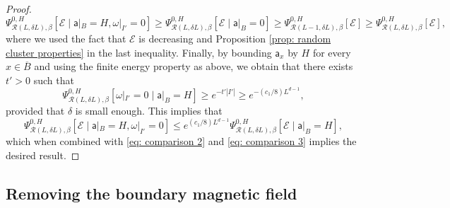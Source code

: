 \documentclass[11pt,a4paper]{article}
\numberwithin{equation}{section}
\theoremstyle{plain}
\theoremstyle{definition}
\begin{document}
\begin{proof}
\begin{equation}\label{eq: comparison 3}
\Psi^{0,H}_{\mathcal{R}(L,\delta L),\beta}[\mathcal{E} \mid \mathsf{a}|_B=H, \omega|_{I'}=0]\geq \Psi^{0,H}_{\mathcal{R}(L,\delta L),\beta}[\mathcal{E}\mid \mathsf{a}|_B=0]\geq \Psi^{0,H}_{\mathcal{R}(L-1,\delta L),\beta}[\mathcal{E}]\geq  \Psi^{0,H}_{\mathcal{R}(L,\delta L),\beta}[\mathcal{E}],
\end{equation}
where we used the fact that $\mathcal{E}$ is decreasing and Proposition \ref{prop: random cluster properties} in the last inequality.
Finally, by bounding $\mathsf{a}_x$ by $H$ for every $x\in \overline{B}$ and using the finite energy property as above, we obtain that there exists $t'>0$ such that
\begin{equation}
\Psi^{0,H}_{\mathcal{R}(L,\delta L),\beta}[\omega|_{I'}=0 \mid \mathsf{a}|_B=H]\geq e^{-t'|I'|}\geq e^{-(c_1/8) L^{d-1}},
\end{equation}
provided that $\delta$ is small enough. This implies that 
\begin{equation}
\Psi^{0,H}_{\mathcal{R}(L,\delta L),\beta}[\mathcal{E} \mid \mathsf{a}|_B=H, \omega|_{I'}=0]\leq e^{(c_1/8) L^{d-1}} \Psi^{0,H}_{\mathcal{R}(L,\delta L),\beta}[\mathcal{E} \mid \mathsf{a}|_B=H],
\end{equation}
which when combined with \eqref{eq: comparison 2} and \eqref{eq: comparison 3} implies the desired result.
\end{proof}



\subsection{Removing the boundary magnetic field}
\end{document}

